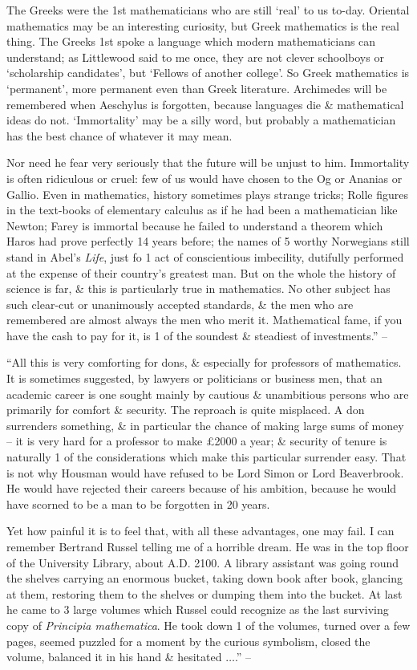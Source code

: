 \documentclass{article}
\numberwithin{equation}{section}
\begin{document}
The Greeks were the 1st mathematicians who are still `real' to us to-day. Oriental mathematics may be an interesting curiosity, but Greek mathematics is the real thing. The Greeks 1st spoke a language which modern mathematicians can understand; as Littlewood said to me once, they are not clever schoolboys or `scholarship candidates', but `Fellows of another college'. So Greek mathematics is `permanent', more permanent even than Greek literature. Archimedes will be remembered when Aeschylus is forgotten, because languages die \& mathematical ideas do not. `Immortality' may be a silly word, but probably a mathematician has the best chance of whatever it may mean.

Nor need he fear very seriously that the future will be unjust to him. Immortality is often ridiculous or cruel: few of us would have chosen to the Og or Ananias or Gallio. Even in mathematics, history sometimes plays strange tricks; Rolle figures in the text-books of elementary calculus as if he had been a mathematician like Newton; Farey is immortal because he failed to understand a theorem which Haros had prove perfectly 14 years before; the names of 5 worthy Norwegians still stand in Abel's \textit{Life}, just fo 1 act of conscientious imbecility, dutifully performed at the expense of their country's greatest man. But on the whole the history of science is far, \& this is particularly true in mathematics. No other subject has such clear-cut or unanimously accepted standards, \& the men who are remembered are almost always the men who merit it. Mathematical fame, if you have the cash to pay for it, is 1 of the soundest \& steadiest of investments.'' -- \cite[pp. 80--82]{Hardy1992}

 ``All this is very comforting for dons, \& especially for professors of mathematics. It is sometimes suggested, by lawyers or politicians or business men, that an academic career is one sought mainly by cautious \& unambitious persons who are primarily for comfort \& security. The reproach is quite misplaced. A don surrenders something, \& in particular the chance of making large sums of money -- it is very hard for a professor to make \pounds2000 a year; \& security of tenure is naturally 1 of the considerations which make this particular surrender easy. That is not why Housman would have refused to be Lord Simon or Lord Beaverbrook. He would have rejected their careers because of his ambition, because he would have scorned to be a man to be forgotten in 20 years.

Yet how painful it is to feel that, with all these advantages, one may fail. I can remember Bertrand Russel telling me of a horrible dream. He was in the top floor of the University Library, about A.D. 2100. A library assistant was going round the shelves carrying an enormous bucket, taking down book after book, glancing at them, restoring them to the shelves or dumping them into the bucket. At last he came to 3 large volumes which Russel could recognize as the last surviving copy of \textit{Principia mathematica}. He took down 1 of the volumes, turned over a few pages, seemed puzzled for a moment by the curious symbolism, closed the volume, balanced it in his hand \& hesitated $\ldots$.'' -- \cite[pp. 82--83]{Hardy1992}
\end{document}
